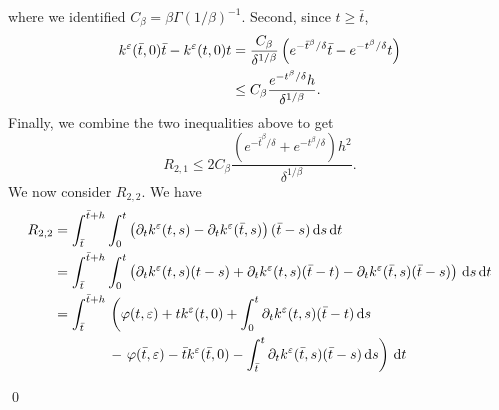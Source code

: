 \documentclass[10pt]{article}
\begin{document}
where we identified $C_\beta=\beta \Gamma(1/\beta)^{-1}$. Second, since $t \geq \bar t$,
\begin{equation}
\begin{aligned}
	k^\varepsilon(\bar t, 0) \bar t - k^\varepsilon(t, 0) t &= \frac{C_\beta}{\delta^{1/\beta}} \left(e^{-\bar t^\beta/\delta} \bar t - e^{-t^\beta / \delta} t\right) \\
	&\leq C_\beta \frac{e^{-t^\beta / \delta} h}{\delta^{1/\beta}}.
\end{aligned}
\end{equation}
Finally, we combine the two inequalities above to get
\begin{equation}
	R_{2,1} \leq 2 C_\beta \frac{\left(e^{-\bar t^\beta / \delta} + e^{-t^\beta / \delta}\right) h^2}{\delta^{1/\beta}}.
\end{equation}
We now consider $R_{2,2}$. We have
\begin{equation}
\begin{aligned}
	R_{2,2} &= \int_{\bar t}^{\bar t + h}\int_0^t \left(\partial_t k^\varepsilon(t, s) - \partial_t k^\varepsilon(\bar t, s)\right)(\bar t - s)  \,\mathrm{d} s \,\mathrm{d} t \\
	&= \int_{\bar t}^{\bar t + h}\int_0^t \left(\partial_t k^\varepsilon(t, s)(t-s) + \partial_t k^\varepsilon(t, s)(\bar t - t) - \partial_t k^\varepsilon(\bar t, s)(\bar t - s)\right)\,\mathrm{d} s \,\mathrm{d} t \\
	&= \int_{\bar t}^{\bar t + h} 
	\begin{aligned}[t]
	&\left(\varphi(t, \varepsilon) + tk^\varepsilon(t, 0) + \int_0^t \partial_t k^\varepsilon(t, s)(\bar t - t) \,\mathrm{d} s \right.\\
	&- \left. \varphi(\bar t, \varepsilon) - \bar t k^\varepsilon(\bar t, 0) - \int_{\bar t}^{t}\partial_t k^\varepsilon(\bar t, s)(\bar t - s) \,\mathrm{d} s \right) \,\mathrm{d} t
	\end{aligned}
\end{aligned}
\end{equation}

\qed




\end{document}

